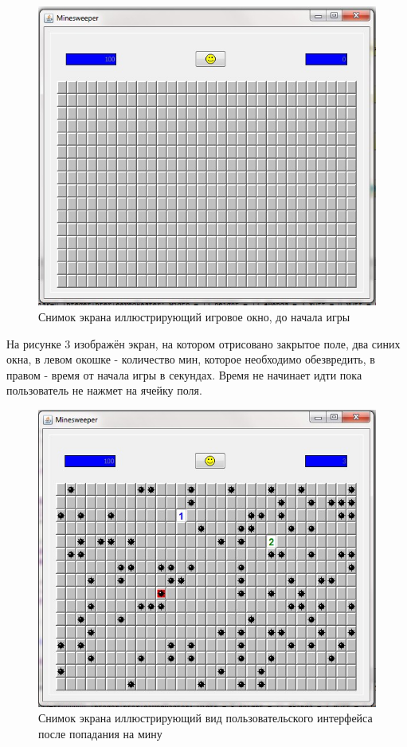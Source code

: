 \begin{figure}[H]
	\begin{center}
		\includegraphics[scale=0.7]{images/1.jpg}
		\caption{Снимок экрана иллюстрирующий игровое окно, до начала игры} 
		\label{pic:pic_name} %
	\end{center}
\end{figure}

На рисунке 3 изображён экран, на котором отрисовано закрытое поле, два синих окна, в левом окошке - количество мин, которое необходимо обезвредить, в правом - время от начала игры в секундах. Время не начинает идти пока пользователь не нажмет на ячейку поля.

\begin{figure}[H]
	\begin{center}
		\includegraphics[scale=0.7]{images/2.jpg}
		\caption{Снимок экрана иллюстрирующий вид пользовательского интерфейса после попадания на мину} 
		\label{pic:pic_name} %
	\end{center}
\end{figure}

